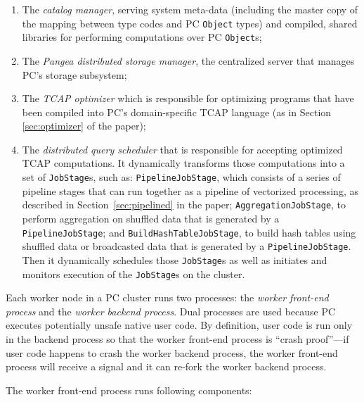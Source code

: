 \begin{enumerate}
\item The \emph{catalog manager}, serving system meta-data (including the master copy of
the mapping between type codes and PC \texttt{Object} types) and compiled, shared libraries
for performing computations over PC \texttt{Object}s;
\item The \emph{Pangea distributed storage manager}, 
the centralized server that manages PC's storage subsystem; 
\item The \emph{TCAP optimizer} which is responsible for optimizing
  programs that have been compiled into PC's domain-specific TCAP
  language (as in 
Section \ref{sec:optimizer} of the paper);
\item The \emph{distributed query scheduler} that is responsible for accepting optimized TCAP computations.
It dynamically transforms those computations into a set of \texttt{JobStage}s,
such as:
\texttt{PipelineJobStage}, which consists of a series of pipeline
stages that can run together as a pipeline of vectorized processing, as
described in Section~\ref{sec:pipelined} in the paper;
\texttt{AggregationJobStage}, to perform aggregation on shuffled data that is
generated by a \texttt{PipelineJobStage}; and \texttt{BuildHashTableJobStage}, to build hash
tables using shuffled data or broadcasted data that is generated by a
\texttt{PipelineJobStage}. Then it
dynamically schedules those \texttt{JobStage}s as well as initiates and
monitors execution of the \texttt{JobStage}s on the cluster.
\end{enumerate}

\noindent 
Each worker node in a PC cluster runs two processes: the \emph{worker front-end process} and the \emph{worker backend process}.
Dual processes are used because PC executes potentially unsafe native user code.  By definition, user code is run only in the backend process so that the
worker front-end process is ``crash proof''---if            
user code happens to crash the worker backend process, the worker front-end process will receive a signal and it can re-fork the worker
backend process.

The worker front-end process runs following components:

